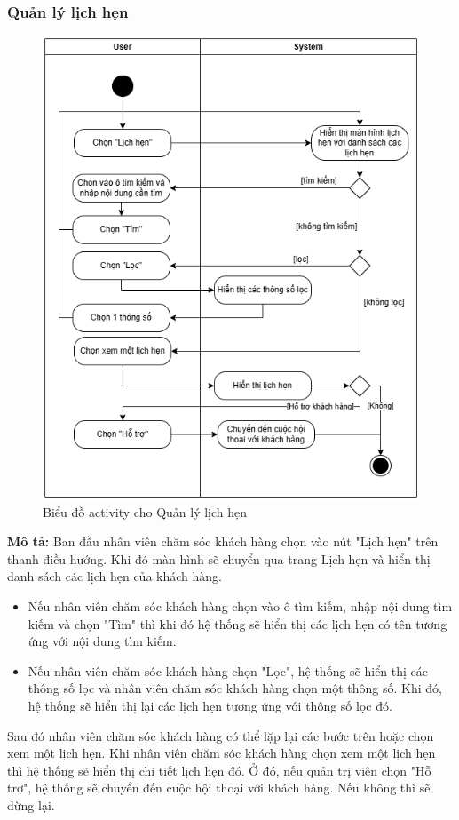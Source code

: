 \subsubsection{Quản lý lịch hẹn}
\begin{figure}[H]
    \centering
    \includegraphics[width=1\textwidth]{Dg_Activity/AppointmentManagement.png}
    \vspace{0.5cm}
    \caption{Biểu đồ activity cho Quản lý lịch hẹn}
    \label{fig:enter-label}
\end{figure}
\textbf{Mô tả:}
Ban đầu nhân viên chăm sóc khách hàng chọn vào nút "Lịch hẹn" trên thanh điều hướng. Khi đó màn hình sẽ chuyển qua trang Lịch hẹn và hiển thị danh sách các lịch hẹn của khách hàng.
\begin{itemize}
    \item Nếu nhân viên chăm sóc khách hàng chọn vào ô tìm kiếm, nhập nội dung tìm kiếm và chọn "Tìm" thì khi đó hệ thống sẽ hiển thị các lịch hẹn có tên tương ứng với nội dung tìm kiếm.
    \item Nếu nhân viên chăm sóc khách hàng chọn "Lọc", hệ thống sẽ hiển thị các thông số lọc và nhân viên chăm sóc khách hàng chọn một thông số. Khi đó, hệ thống sẽ hiển thị lại các lịch hẹn tương ứng với thông số lọc đó. 
\end{itemize}
Sau đó nhân viên chăm sóc khách hàng có thể lặp lại các bước trên hoặc chọn xem một lịch hẹn. Khi nhân viên chăm sóc khách hàng chọn xem một lịch hẹn thì hệ thống sẽ hiển thị chi tiết lịch hẹn đó. Ở đó, nếu quản trị viên chọn "Hỗ trợ", hệ thống sẽ chuyển đến cuộc hội thoại với khách hàng. Nếu không thì sẽ dừng lại.



